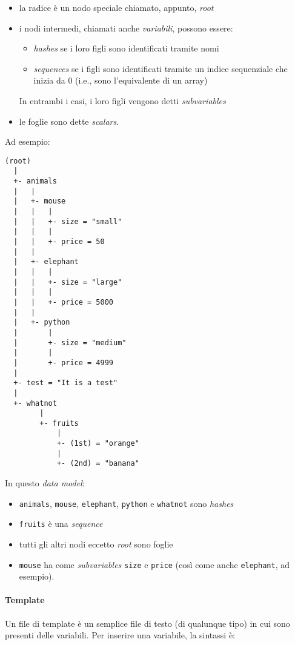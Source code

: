\begin{itemize}
\item la radice è un nodo speciale chiamato, appunto, \textit{root}
\item i nodi intermedi, chiamati anche \textsl{variabili}, possono essere:
\begin{itemize}
\item \textit{hashes} se i loro figli sono identificati tramite nomi
\item \textit{sequences} se i figli sono identificati tramite un indice sequenziale che inizia da 0 (i.e., sono l'equivalente di un array)
\end{itemize}
In entrambi i casi, i loro figli vengono detti \textit{subvariables}
\item le foglie sono dette \textit{scalars}.
\end{itemize}

Ad esempio:

\begin{lstlisting}
(root)
  |
  +- animals
  |   |
  |   +- mouse
  |   |   |   
  |   |   +- size = "small"
  |   |   |   
  |   |   +- price = 50
  |   |
  |   +- elephant
  |   |   |   
  |   |   +- size = "large"
  |   |   |   
  |   |   +- price = 5000
  |   |
  |   +- python
  |       |   
  |       +- size = "medium"
  |       |   
  |       +- price = 4999
  |
  +- test = "It is a test"
  |
  +- whatnot
        |
        +- fruits
            |
            +- (1st) = "orange"
            |
            +- (2nd) = "banana"
\end{lstlisting}

In questo \textit{data model}:

\begin{itemize}
\item \lstinline{animals}, \lstinline{mouse}, \lstinline{elephant}, \lstinline{python} e \lstinline{whatnot} sono \textit{hashes}
\item \lstinline{fruits} è una \textit{sequence}
\item tutti gli altri nodi eccetto \textit{root} sono foglie
\item \lstinline{mouse} ha come \textit{subvariables} \lstinline{size} e \lstinline{price} (così come anche \lstinline{elephant}, ad esempio).
\end{itemize}


\paragraph{Template} 
Un file di template è un semplice file di testo (di qualunque tipo) in cui sono presenti delle variabili. Per inserire una variabile, la sintassi è:

